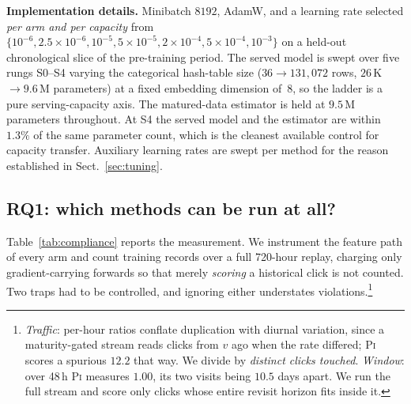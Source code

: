 \documentclass[runningheads]{llncs}
\begin{document}
\noindent\textbf{Implementation details.} Minibatch $8192$, AdamW, and a learning rate selected
\emph{per arm and per capacity} from
$\{10^{-6}, 2.5{\times}10^{-6}, 10^{-5}, 5{\times}10^{-5}, 2{\times}10^{-4}, 5{\times}10^{-4},
10^{-3}\}$ on a held-out chronological slice of the pre-training period. The served model is swept
over five rungs S0--S4 varying the categorical hash-table size ($36 \to 131{,}072$ rows, $26$\,K
$\to 9.6$\,M parameters) at a fixed embedding dimension of~8, so the ladder is a pure
serving-capacity axis. The matured-data estimator is held at $9.5$\,M parameters throughout. At S4
the served model and the estimator are within $1.3\%$ of the same parameter count, which is the
cleanest available control for capacity transfer. Auxiliary learning rates are swept per method for
the reason established in Sect.~\ref{sec:tuning}.

\subsection{RQ1: which methods can be run at all?}\label{sec:audit}

\begin{table}[t]
\caption{Training records per click, measured over a full 720-hour replay at $v=7$\,d. Counts are
per \emph{distinct click touched}, so traffic variation cannot inflate them, and the window covers
every method's longest revisit lag. $^{\dag}$\textsc{Twice}'s served tower is single-visit; its
delay head reads the conversion clock}
\label{tab:compliance}
\centering\small

\end{table}

Table~\ref{tab:compliance} reports the measurement. We instrument the feature path of every arm and
count training records over a full 720-hour replay, charging only gradient-carrying forwards so
that merely \emph{scoring} a historical click is not counted. Two traps had to be controlled, and
ignoring either understates violations.\footnote{\emph{Traffic}: per-hour ratios conflate
duplication with diurnal variation, since a maturity-gated stream reads clicks from $v$ ago when the
rate differed; \textsc{Pi} scores a spurious $12.2$ that way. We divide by \emph{distinct clicks
touched}. \emph{Window}: over 48\,h \textsc{Pi} measures $1.00$, its two visits being $10.5$ days
apart. We run the full stream and score only clicks whose entire revisit horizon fits inside it.}
\end{document}
